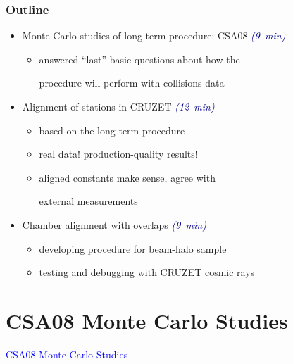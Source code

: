 \documentclass[compress]{beamer}
\begin{document}
\begin{frame}
\frametitle{Outline}
\begin{itemize}\setlength{\itemsep}{0.75 cm}
\item Monte Carlo studies of long-term procedure: CSA08 \hfill {\scriptsize \it \textcolor{darkblue}{(9~min)}}
\begin{itemize}
\item answered ``last'' basic questions about how the

procedure will perform with collisions data
\end{itemize}

\item Alignment of stations in CRUZET \hfill {\scriptsize \it \textcolor{darkblue}{(12~min)}}
\begin{itemize}
\item based on the long-term procedure
\item real data! production-quality results!
\item aligned constants make sense, agree with

external measurements
\end{itemize}

\item Chamber alignment with overlaps \hfill {\scriptsize \it \textcolor{darkblue}{(9~min)}}
\begin{itemize}
\item developing procedure for beam-halo sample
\item testing and debugging with CRUZET cosmic rays
\end{itemize}
\end{itemize}
\end{frame}

\section*{CSA08 Monte Carlo Studies}
\begin{frame}
\begin{center}
\Huge \textcolor{blue}{CSA08 Monte Carlo Studies}
\end{center}
\end{frame}
\end{document}
